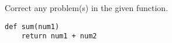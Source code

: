 Correct any problem(s) in the given function.
\begin{verbatim}
def sum(num1)
    return num1 + num2
\end{verbatim}
